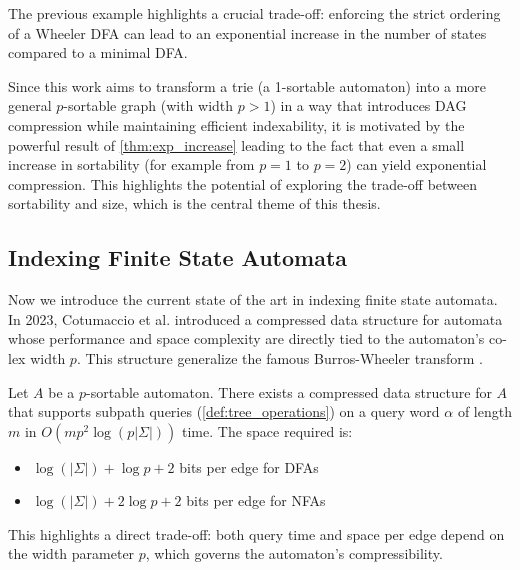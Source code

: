 The previous example highlights a crucial trade-off: enforcing the strict ordering of a Wheeler DFA can lead to an exponential increase in the number of states compared to a minimal DFA. 

\begin{comment}
\cref{thm:exp_increase} formalizes this observation, showing that the size of a minimal Wheeler DFA cannot be bounded by a polynomial in the size of the minimal DFA.
\begin{theorem}[\cite{manziniRationalConstructionWheeler2024}, Theorem 29] \label{thm:exp_increase}
    Let $L = \mathcal{L}(D) = \mathcal{L}(D^w)$, where $L$ is Wheeler, $D$ is minimal, $D^w$ is minimal Wheeler, and let $f(\cdot,\cdot)$ be such that \\
    $|D^w| = \mathcal{O}(f(|D|,width(D)))$. Then, for any $k,p \in \mathbb{N}$, $f(n,p) \notin \mathcal{O}(n^k + 2^p)$.
\end{theorem}
\end{comment}

Since this work aims to transform a trie (a 1-sortable automaton) into a more general $p$-sortable graph (with width $p>1$) in a way that introduces DAG compression while maintaining efficient indexability, it is motivated by the powerful result of \cref{thm:exp_increase} leading to the fact that even a small increase in sortability (for example from $p=1$ to $p=2$) can yield exponential compression. This highlights the potential of exploring the trade-off between sortability and size, which is the central theme of this thesis.

\subsection{Indexing Finite State Automata} \label{sec:indexing}
Now we introduce the current state of the art in indexing finite state automata. In 2023, Cotumaccio et al. \cite{cotumaccio2021indexing} introduced a compressed data structure for automata whose performance and space complexity are directly tied to the automaton's co-lex width $p$. This structure generalize the famous Burros-Wheeler transform \cite{burrows1994block}. 

\begin{theorem}
    \label{thm:indexing}
    Let $A$ be a $p$-sortable automaton. There exists a compressed data structure for $A$ that supports subpath queries (\cref{def:tree_operations}) on a query word $\alpha$ of length $m$ in $O(mp^2\log(p|\Sigma|))$ time. The space required is:
    \begin{itemize}
        \item $\log(|\Sigma|) + \log p + 2$ bits per edge for DFAs
        \item $\log(|\Sigma|) + 2\log p + 2$ bits per edge for NFAs
    \end{itemize}
\end{theorem}
This highlights a direct trade-off: both query time and space per edge depend on the width parameter $p$, which governs the automaton's compressibility.

